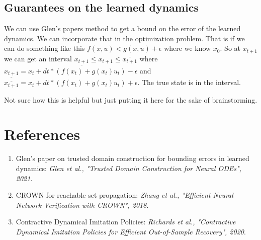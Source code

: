 \documentclass[12pt]{article}
\begin{document}
\subsection{Guarantees on the learned dynamics}
We can use Glen's papers method to get a bound on the error of the learned dynamics. We can incorporate that in the optimization problem. That is if we can do something like this \(f(x,u) < g(x,u) + \epsilon\) where we know \(x_{0}\).
So at \(x_{t+1}\) we can get an interval \(\underline{x_{t+1}} \leq x_{t+1} \leq \overline{x_{t+1}}\) where \(\underline{x_{t+1}} = x_{t} + dt * (f(x_{t}) + g(x_{t})u_{t}) - \epsilon\) and \(\overline{x_{t+1}} = x_{t} + dt * (f(x_{t}) + g(x_{t})u_{t}) + \epsilon\). The true state is in the interval.

Not sure how this is helpful but just putting it here for the sake of brainstorming. 



\section{References}

\begin{enumerate}
    \item Glen's paper on trusted domain construction for bounding errors in learned dynamics: \textit{Glen et al., "Trusted Domain Construction for Neural ODEs", 2021}.
    \item CROWN for reachable set propagation: \textit{Zhang et al., "Efficient Neural Network Verification with CROWN", 2018}.
    \item Contractive Dynamical Imitation Policies: \textit{Richards et al., "Contractive Dynamical Imitation Policies for Efficient Out-of-Sample Recovery", 2020}.
\end{enumerate}
\end{document}
